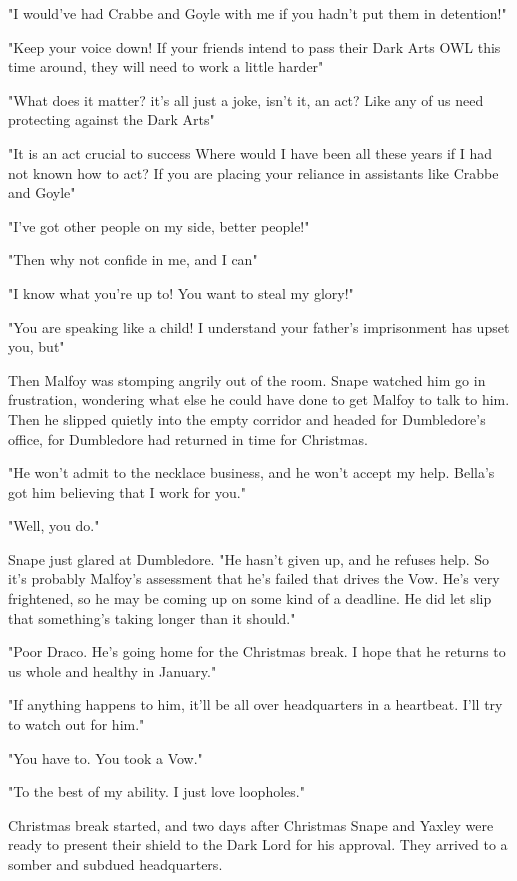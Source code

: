 "I would've had Crabbe and Goyle with me if you hadn't put them in detention!"

"Keep your voice down! If your friends intend to pass their Dark Arts OWL this time around, they will need to work a little harder{\el}"

"What does it matter?{\el} it's all just a joke, isn't it, an act? Like any of us need protecting against the Dark Arts{\el}"

"It is an act crucial to success{\el} Where would I have been all these years if I had not known how to act? If you are placing your reliance in assistants like Crabbe and Goyle{\el}"

"I've got other people on my side, better people!"

"Then why not confide in me, and I can{\el}"

"I know what you're up to! You want to steal my glory!"

"You are speaking like a child! I understand your father's imprisonment has upset you, but{\el}"

Then Malfoy was stomping angrily out of the room. Snape watched him go in frustration, wondering what else he could have done to get Malfoy to talk to him. Then he slipped quietly into the empty corridor and headed for Dumbledore's office, for Dumbledore had returned in time for Christmas.

"He won't admit to the necklace business, and he won't accept my help. Bella's got him believing that I work for you."

"Well, you do."

Snape just glared at Dumbledore. "He hasn't given up, and he refuses help. So it's probably Malfoy's assessment that he's failed that drives the Vow. He's very frightened, so he may be coming up on some kind of a deadline. He did let slip that something's taking longer than it should."

"Poor Draco. He's going home for the Christmas break. I hope that he returns to us whole and healthy in January."

"If anything happens to him, it'll be all over headquarters in a heartbeat. I'll try to watch out for him."

"You have to. You took a Vow."

"To the best of my ability. I just love loopholes."

Christmas break started, and two days after Christmas Snape and Yaxley were ready to present their shield to the Dark Lord for his approval. They arrived to a somber and subdued headquarters.


